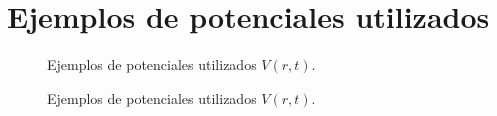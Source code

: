 \section{Ejemplos de potenciales utilizados}

\begin{figure}[H]
  \centering
  \caption{Ejemplos de potenciales utilizados $V(r,t)$.}
\end{figure}

\begin{figure}[H]
  \centering
  \caption{Ejemplos de potenciales utilizados $V(r,t)$.}
\end{figure}




